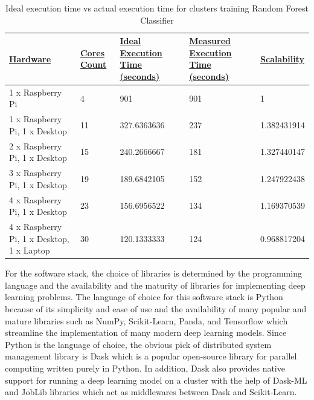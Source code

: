 \documentclass{IEEEtran}
\begin{document}
        \begin{table}[]
            \begin{tabular}{|l|l|l|l|l|}
            \hline
            {\ul \textbf{Hardware}}                   & {\ul \textbf{Cores Count}} & {\ul \textbf{Ideal Execution Time (seconds)}} & {\ul \textbf{Measured Execution Time (seconds)}} & {\ul \textbf{Scalability}} \\ \hline
            1 x Raspberry Pi                          & 4                          & 901                                           & 901                                              & 1                          \\ \hline
            1 x Raspberry Pi, 1 x Desktop             & 11                         & 327.6363636                                   & 237                                              & 1.382431914                \\ \hline
            2 x Raspberry Pi, 1 x Desktop             & 15                         & 240.2666667                                   & 181                                              & 1.327440147                \\ \hline
            3 x Raspberry Pi, 1 x Desktop             & 19                         & 189.6842105                                   & 152                                              & 1.247922438                \\ \hline
            4 x Raspberry Pi, 1 x Desktop             & 23                         & 156.6956522                                   & 134                                              & 1.169370539                \\ \hline
            4 x Raspberry Pi, 1 x Desktop, 1 x Laptop & 30                         & 120.1333333                                   & 124                                              & 0.968817204                \\ \hline
            \end{tabular}
            \caption{Ideal execution time vs actual execution time for clusters training Random Forest Classifier}
        \end{table}
        
        For the software stack, the choice of libraries is determined by the programming language and the availability and the maturity of libraries for implementing deep learning problems. The language of choice for this software stack is Python because of its simplicity and ease of use and the availability of many popular and mature libraries such as NumPy, Scikit-Learn, Panda, and Tensorflow which streamline the implementation of many modern deep learning models. Since Python is the language of choice, the obvious pick of distributed system management library is Dask which is a popular open-source library for parallel computing written purely in Python. In addition, Dask also provides native support for running a deep learning model on a cluster with the help of Dask-ML and JobLib libraries which act as middlewares between Dask and Scikit-Learn. 
\end{document}
